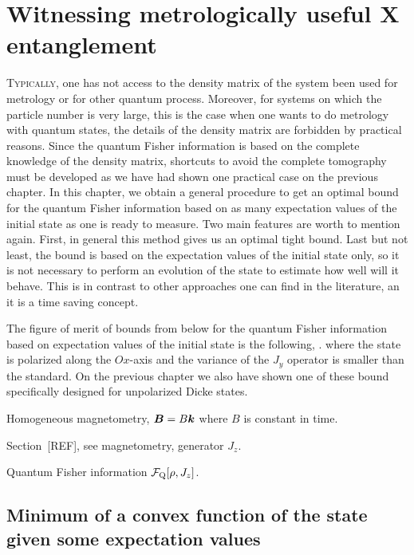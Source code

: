 \section[Witnessing metrologically useful entanglement]
{Witnessing metrologically useful {\color{grey} X} entanglement}


\lettrine[lines=2, findent=3pt,nindent=0pt]{T}{ypically}, one has not access to the density matrix of the system been used for metrology or for other quantum process.
Moreover, for systems on which the particle number is very large, this is the case when one wants to do metrology with quantum states, the details of the density matrix are forbidden by practical reasons.
Since the quantum Fisher information is based on the complete knowledge of the density matrix, shortcuts to avoid the complete tomography must be developed as we have had shown one practical case on the previous chapter.
In this chapter, we obtain a general procedure to get an optimal bound for the quantum Fisher information based on as many expectation values of the initial state as one is ready to measure.
Two main features are worth to mention again.
First, in general this method gives us an optimal tight bound.
Last but not least, the bound is based on the expectation values of the initial state only, so it is not necessary to perform an evolution of the state to estimate how well will it behave.
This is in contrast to other approaches one can find in the literature, an it is a time saving concept.

The figure of merit of bounds from below for the quantum Fisher information based on expectation values of the initial state is the following,
\be
  \qfi [\rho,J_z] \geq {}.
\ee
where the state is polarized along the $Ox$-axis and the variance of the $J_y$ operator is smaller than the standard.
On the previous chapter we also have shown one of these bound specifically designed for unpolarized Dicke states.

Homogeneous magnetometry, $\boldsymbol{B} = B\boldsymbol{k}$ where $B$ is constant in time.

Section~[REF], see magnetometry, generator $J_z$.

Quantum Fisher information $\mathcal{F}_{\text{Q}} [\rho, J_z]$.

\subsection{Minimum of a convex function of the state given some expectation values}

